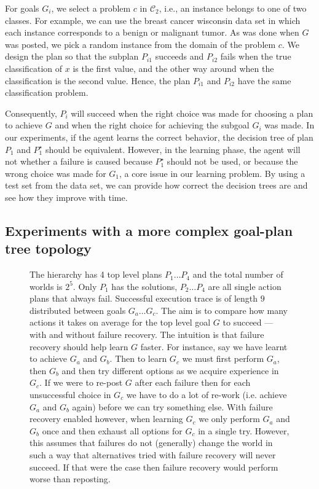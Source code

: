 \documentclass{article}
\newcommand{\C}{{\mathscr C}}
\begin{document}
For goals $G_i$, we select a problem $c$ in $\C_2$, i.e., an instance
belongs to one of two classes. For example, we can use the breast
cancer wisconsin data set in which each instance corresponds to a
benign or malignant tumor.  As was done when $G$ was posted, we pick a
random instance from the domain of the problem $c$. We design the plan
so that the subplan $P_{i1}$ succeeds and $P_{i2}$ fails when the true
classification of $x$ is the first value, and the other way around
when the classification is the second value.  Hence, the plan $P_{i1}$
and $P_{i2}$ have the same classification problem. 

Consequently, $P_i$ will succeed when the right choice was made for
choosing a plan to achieve $G$ and when the right choice for achieving
the subgoal $G_i$ was made. In our experiments, if the agent learns
the correct behavior, the decision tree of plan $P_1$ and $P^\star_1$
should be equivalent. However, in the learning phase, the agent will
not whether a failure is caused because $P^\star_1$ should not be
used, or because the wrong choice was made for $G_1$, a core issue in
our learning problem. By using a test set from the data set, we can
provide how correct the decision trees are and see how they improve
with time.


\subsection{Experiments with a more complex goal-plan tree topology}




\begin{figure*}[t]
\begin{center}
\resizebox{0.8\textwidth}{!}{

}
\end{center}
\caption{The hierarchy has 4 top level plans $P_1 \ldots P_4$ and the total number of worlds is $2^5$. Only $P_1$ has the solutions, $P_2 \ldots P_4$ are all single action plans that always fail. Successful execution trace is of length $9$ distributed between goals $G_a \ldots G_c$. The aim is to compare how many actions it takes on average for the top level goal $G$ to succeed --- with and without failure recovery. The intuition is that failure recovery should help learn $G$ faster. For instance, say we have learnt to achieve $G_a$ and $G_b$. Then to learn $G_c$ we must first perform $G_a$, then $G_b$ and then try different options as we acquire experience in $G_c$. If we were to re-post $G$ after each failure then for each unsuccessful choice in $G_c$ we have to do a lot of re-work (i.e. achieve $G_a$ and $G_b$ again) before we can try something else. With failure recovery enabled however, when learning $G_c$ we only perform $G_a$ and $G_b$ once and then exhaust all options for $G_c$ in a single try. However, this assumes that failures do not (generally) change the world in such a way that alternatives tried with failure recovery will never succeed. If that were the case then failure recovery would perform worse than reposting.}
\label{fig:test01fr}
\end{figure*}
\end{document}
